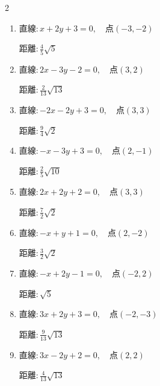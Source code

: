 \begin{multicols}{2}
\begin{enumerate}
  \item $直線:x+2y+3=0,\quad 点 ( -3, -2 )$

        $\displaystyle 距離 : \frac{4}{5}\sqrt{5}$

  \item $直線:2x-3y-2=0,\quad 点 ( 3, 2 )$

        $\displaystyle 距離 : \frac{2}{13}\sqrt{13}$

  \item $直線:-2x-2y+3=0,\quad 点 ( 3, 3 )$

        $\displaystyle 距離 : \frac{9}{4}\sqrt{2}$

  \item $直線:-x-3y+3=0,\quad 点 ( 2, -1 )$

        $\displaystyle 距離 : \frac{2}{5}\sqrt{10}$

  \item $直線:2x+2y+2=0,\quad 点 ( 3, 3 )$

        $\displaystyle 距離 : \frac{7}{2}\sqrt{2}$

  \item $直線:-x+y+1=0,\quad 点 ( 2, -2 )$

        $\displaystyle 距離 : \frac{3}{2}\sqrt{2}$

  \item $直線:-x+2y-1=0,\quad 点 ( -2, 2 )$

        $\displaystyle 距離 : \sqrt{5}$

  \item $直線:3x+2y+3=0,\quad 点 ( -2, -3 )$

        $\displaystyle 距離 : \frac{9}{13}\sqrt{13}$

  \item $直線:3x-2y+2=0,\quad 点 ( 2, 2 )$

        $\displaystyle 距離 : \frac{4}{13}\sqrt{13}$

\end{enumerate}
\end{multicols}

